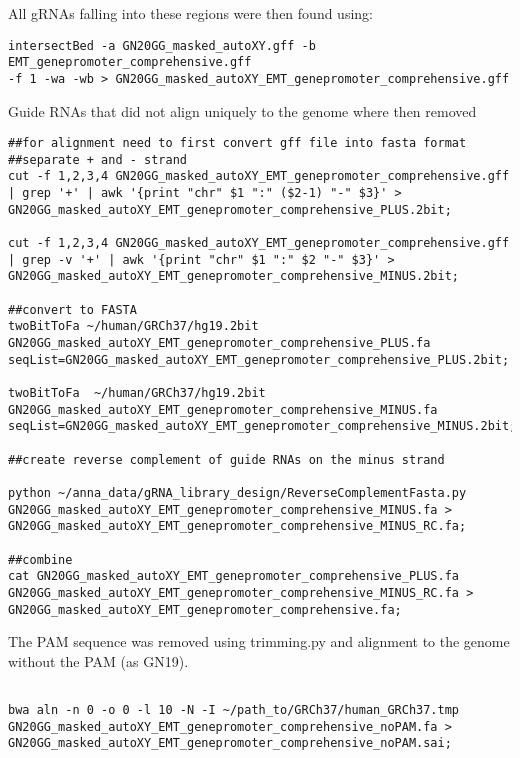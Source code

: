 \begin{footnotesize}
\begin{tabular}[H]{llll}
\end{tabular}

All gRNAs falling into these regions were then found using:

\begin{lstlisting}
intersectBed -a GN20GG_masked_autoXY.gff -b EMT_genepromoter_comprehensive.gff
-f 1 -wa -wb > GN20GG_masked_autoXY_EMT_genepromoter_comprehensive.gff
\end{lstlisting}

Guide RNAs that did not align uniquely to the genome where then removed

\begin{lstlisting}
##for alignment need to first convert gff file into fasta format
##separate + and - strand
cut -f 1,2,3,4 GN20GG_masked_autoXY_EMT_genepromoter_comprehensive.gff | grep '+' | awk '{print "chr" $1 ":" ($2-1) "-" $3}' > GN20GG_masked_autoXY_EMT_genepromoter_comprehensive_PLUS.2bit;

cut -f 1,2,3,4 GN20GG_masked_autoXY_EMT_genepromoter_comprehensive.gff | grep -v '+' | awk '{print "chr" $1 ":" $2 "-" $3}' > GN20GG_masked_autoXY_EMT_genepromoter_comprehensive_MINUS.2bit;

##convert to FASTA
twoBitToFa ~/human/GRCh37/hg19.2bit GN20GG_masked_autoXY_EMT_genepromoter_comprehensive_PLUS.fa seqList=GN20GG_masked_autoXY_EMT_genepromoter_comprehensive_PLUS.2bit;

twoBitToFa  ~/human/GRCh37/hg19.2bit GN20GG_masked_autoXY_EMT_genepromoter_comprehensive_MINUS.fa seqList=GN20GG_masked_autoXY_EMT_genepromoter_comprehensive_MINUS.2bit;

##create reverse complement of guide RNAs on the minus strand

python ~/anna_data/gRNA_library_design/ReverseComplementFasta.py GN20GG_masked_autoXY_EMT_genepromoter_comprehensive_MINUS.fa > GN20GG_masked_autoXY_EMT_genepromoter_comprehensive_MINUS_RC.fa;

##combine
cat GN20GG_masked_autoXY_EMT_genepromoter_comprehensive_PLUS.fa GN20GG_masked_autoXY_EMT_genepromoter_comprehensive_MINUS_RC.fa > GN20GG_masked_autoXY_EMT_genepromoter_comprehensive.fa;

\end{lstlisting}

The PAM sequence was removed using trimming.py and alignment to the genome without the PAM (as GN19).

\begin{lstlisting}

bwa aln -n 0 -o 0 -l 10 -N -I ~/path_to/GRCh37/human_GRCh37.tmp
GN20GG_masked_autoXY_EMT_genepromoter_comprehensive_noPAM.fa >
GN20GG_masked_autoXY_EMT_genepromoter_comprehensive_noPAM.sai;


\end{lstlisting}
\end{footnotesize}
